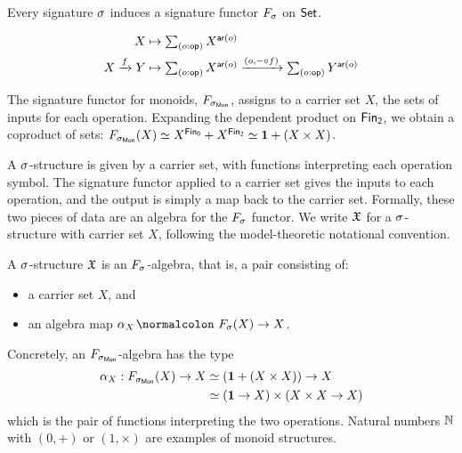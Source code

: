 \noindent
Every signature $\sigma$ induces a signature functor $\Sig$ on $\mathsf{Set}$.

\begin{definition}
    \label{def:signature-functor}
    \begin{align*}
        X           & \mapsto \dsum{o:\op}{X^{\ar(o)}} \\
        X \xto{f} Y & \mapsto
        \dsum{o:\op}{X^{\ar(o)}}
        \xto{(o, \blank \comp f)}
        \dsum{o:\op}{Y^{\ar(o)}}
    \end{align*}
\end{definition}

\begin{example}
    The signature functor for monoids, $\SigMon$, assigns to a carrier set $X$,
    the sets of inputs for each operation.
    Expanding the dependent product on $\Fin[2]$, we obtain a coproduct of sets:
    $\SigMon(X) \eqv X^{\Fin[0]} + X^{\Fin[2]} \eqv \unitt + (X \times X)$.
\end{example}

A $\sigma$-structure is given by a carrier set, with functions interpreting each operation symbol.
%
The signature functor applied to a carrier set gives the inputs to each operation,
and the output is simply a map back to the carrier set.
%
Formally, these two pieces of data are an algebra for the $\Sig$ functor.
%
We write $\mathfrak{X}$ for a $\sigma$-structure with carrier set $X$, following the model-theoretic notational convention.

\begin{definition}[Structure]\label{algebra:struct}
    A $\sigma$-structure $\mathfrak{X}$ is an $\Sig$-algebra, that is, a pair consisting of:
    \begin{itemize}
        \item a carrier set $X$, and
        \item an algebra map $\alpha_{X}\colon \Sig(X) \to X$.
    \end{itemize}
\end{definition}

\begin{example}
    Concretely, an $\SigMon$-algebra has the type
    \[
        \begin{aligned}
            \alpha_{X} : \SigMon(X) \to X & \eqv (\unitt + (X \times X)) \to X            \\
                                          & \eqv (\unitt \to X) \times (X \times X \to X)
        \end{aligned}
    \]
    which is the pair of functions interpreting the two operations.
    Natural numbers $\mathbb{N}$ with $(0, +)$ or $(1, \times)$ are examples of monoid structures.
\end{example}

